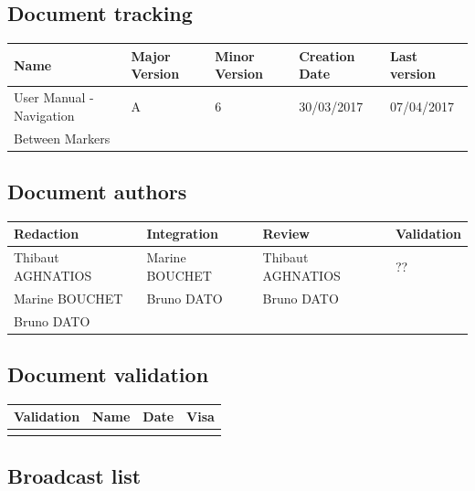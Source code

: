 \documentclass[10pt,a4paper]{article}
\begin{document}
\newpage


\subsection*{Document tracking}

\begin{center}
    \begin{tabular}{| l | l | l | l | l |}
    \hline
     \rowcolor{gray} Name & Major Version & Minor Version & Creation Date & Last version \\ \hline
    User Manual - Navigation & A & 6 & 30/03/2017 & 07/04/2017 \\ 
    Between Markers &  &  &  &  \\ \hline
    \end{tabular}
\end{center}


\subsection*{Document authors}

\begin{center}
    \begin{tabular}{| l | l | l | l |}
    \hline
    \rowcolor{gray} Redaction & Integration & Review & Validation \\ \hline
    Thibaut AGHNATIOS & Marine BOUCHET & Thibaut AGHNATIOS & ?? \\  
    Marine BOUCHET & Bruno DATO & Bruno DATO  &  \\  
    Bruno DATO &  & &  \\  \hline
    \end{tabular}
\end{center}

\subsection*{Document validation}

\begin{center}
    \begin{tabular}{| l | l | l | l |}
    \hline
     \rowcolor{gray} Validation & Name & Date & Visa \\ \hline
    & & & \\
     \hline
    \end{tabular}
\end{center}

\subsection*{Broadcast list}
\end{document}
